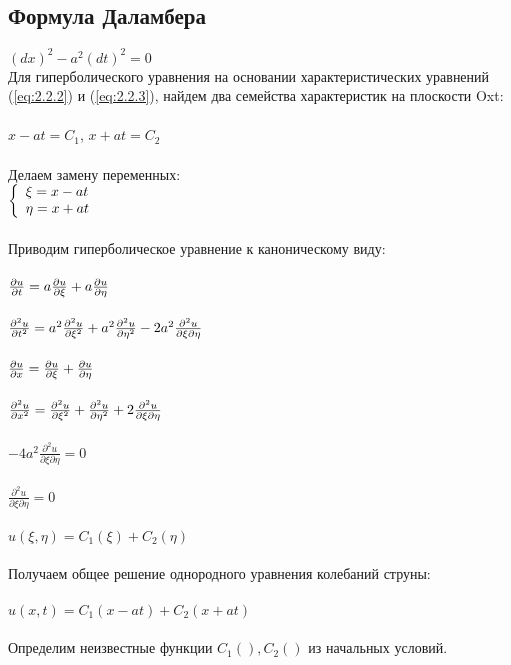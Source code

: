\documentclass[../main.tex]{subfiles}
\begin{document}
\subsection{Формула Даламбера}
    $(dx)^2-a^2(dt)^2=0$\\
    Для гиперболического уравнения на основании характеристических уравнений (\ref{eq:2.2.2}) и (\ref{eq:2.2.3}), найдем два семейства характеристик на плоскости Oxt:\\\\
$x-at=C_1$,       $x+at=C_2$\\\\
Делаем замену переменных:\\
$
\begin{left}
\{
\begin{array}{lcl}
\xi=x-at\\
\eta=x+at\\
\end{array}
\right.
\end{left}
$\\\\
Приводим гиперболическое уравнение к каноническому виду:\\\\
$\frac{\partial u}{\partial t}=a\frac{\partial u}{\partial \xi}+a\frac{\partial u}{\partial \eta}$\\ \\
$\frac{\partial^2 u}{\partial t^2}=a^2\frac{\partial^2 u}{\partial \xi^2}+a^2\frac{\partial^2 u}{\partial \eta^2}-2a^2\frac{\partial^2 u}{\partial\xi\partial\eta}$\\ \\
$\frac{\partial u}{\partial x}=\frac{\partial u}{\partial \xi}+\frac{\partial u}{\partial \eta}$\\ \\
$\frac{\partial^2 u}{\partial x^2}=\frac{\partial^2 u}{\partial \xi^2}+\frac{\partial^2 u}{\partial \eta^2}+2\frac{\partial^2 u}{\partial\xi\partial\eta}$\\ \\
$-4a^2\frac{\partial^2 u}{\partial\xi\partial\eta}=0$\\ \\
$\frac{\partial^2 u}{\partial\xi\partial\eta}=0$\\ \\ $u(\xi,\eta)=C_1(\xi)+C_2(\eta)$ \\ \\
Получаем общее решение однородного уравнения колебаний струны:\\\\
$u(x,t)=C_1(x-at)+C_2(x+at)$\\\\
Определим неизвестные функции $C_1(), C_2()$ из начальных условий.\\\\
\end{document}
